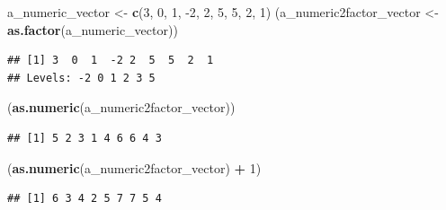 \documentclass[
  ignorenonframetext,
]{beamer}
\newenvironment{Shaded}{\begin{snugshade}}{\end{snugshade}}
\newcommand{\DecValTok}[1]{\textcolor[rgb]{0.00,0.00,0.81}{#1}}
\newcommand{\KeywordTok}[1]{\textcolor[rgb]{0.13,0.29,0.53}{\textbf{#1}}}
\newcommand{\NormalTok}[1]{#1}
\newcommand{\OperatorTok}[1]{\textcolor[rgb]{0.81,0.36,0.00}{\textbf{#1}}}
\newcommand{\StringTok}[1]{\textcolor[rgb]{0.31,0.60,0.02}{#1}}
\begin{document}
\begin{frame}[fragile]

\begin{Shaded}
\begin{Highlighting}[]
\NormalTok{a_numeric_vector <-}\StringTok{ }\KeywordTok{c}\NormalTok{(}\DecValTok{3}\NormalTok{, }\DecValTok{0}\NormalTok{, }\DecValTok{1}\NormalTok{, }\DecValTok{-2}\NormalTok{, }\DecValTok{2}\NormalTok{, }\DecValTok{5}\NormalTok{, }\DecValTok{5}\NormalTok{, }\DecValTok{2}\NormalTok{, }\DecValTok{1}\NormalTok{)}
\NormalTok{(a_numeric2factor_vector <-}\StringTok{ }\KeywordTok{as.factor}\NormalTok{(a_numeric_vector))}
\end{Highlighting}
\end{Shaded}

\begin{verbatim}
## [1] 3  0  1  -2 2  5  5  2  1 
## Levels: -2 0 1 2 3 5
\end{verbatim}

\begin{Shaded}
\begin{Highlighting}[]
\NormalTok{(}\KeywordTok{as.numeric}\NormalTok{(a_numeric2factor_vector))}
\end{Highlighting}
\end{Shaded}

\begin{verbatim}
## [1] 5 2 3 1 4 6 6 4 3
\end{verbatim}

\begin{Shaded}
\begin{Highlighting}[]
\NormalTok{(}\KeywordTok{as.numeric}\NormalTok{(a_numeric2factor_vector) }\OperatorTok{+}\StringTok{ }\DecValTok{1}\NormalTok{)}
\end{Highlighting}
\end{Shaded}

\begin{verbatim}
## [1] 6 3 4 2 5 7 7 5 4
\end{verbatim}

\end{frame}
\end{document}
